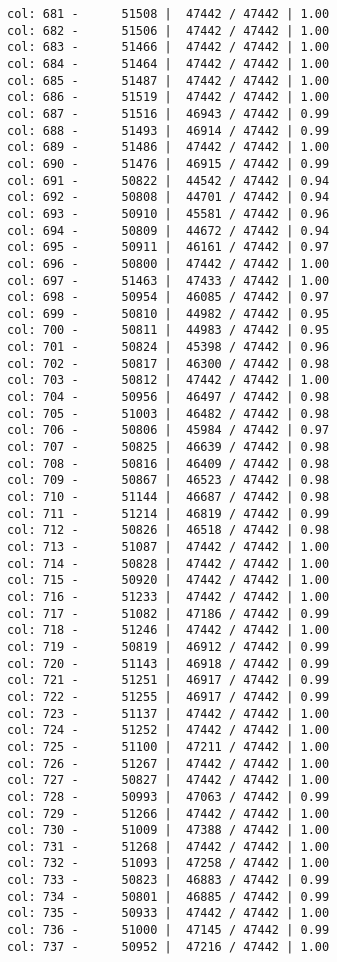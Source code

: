 \documentclass[11pt]{article}
\begin{document}
\begin{Verbatim}[commandchars=\\\{\}]
col: 681 -      51508 |  47442 / 47442 | 1.00
col: 682 -      51506 |  47442 / 47442 | 1.00
col: 683 -      51466 |  47442 / 47442 | 1.00
col: 684 -      51464 |  47442 / 47442 | 1.00
col: 685 -      51487 |  47442 / 47442 | 1.00
col: 686 -      51519 |  47442 / 47442 | 1.00
col: 687 -      51516 |  46943 / 47442 | 0.99
col: 688 -      51493 |  46914 / 47442 | 0.99
col: 689 -      51486 |  47442 / 47442 | 1.00
col: 690 -      51476 |  46915 / 47442 | 0.99
col: 691 -      50822 |  44542 / 47442 | 0.94
col: 692 -      50808 |  44701 / 47442 | 0.94
col: 693 -      50910 |  45581 / 47442 | 0.96
col: 694 -      50809 |  44672 / 47442 | 0.94
col: 695 -      50911 |  46161 / 47442 | 0.97
col: 696 -      50800 |  47442 / 47442 | 1.00
col: 697 -      51463 |  47433 / 47442 | 1.00
col: 698 -      50954 |  46085 / 47442 | 0.97
col: 699 -      50810 |  44982 / 47442 | 0.95
col: 700 -      50811 |  44983 / 47442 | 0.95
col: 701 -      50824 |  45398 / 47442 | 0.96
col: 702 -      50817 |  46300 / 47442 | 0.98
col: 703 -      50812 |  47442 / 47442 | 1.00
col: 704 -      50956 |  46497 / 47442 | 0.98
col: 705 -      51003 |  46482 / 47442 | 0.98
col: 706 -      50806 |  45984 / 47442 | 0.97
col: 707 -      50825 |  46639 / 47442 | 0.98
col: 708 -      50816 |  46409 / 47442 | 0.98
col: 709 -      50867 |  46523 / 47442 | 0.98
col: 710 -      51144 |  46687 / 47442 | 0.98
col: 711 -      51214 |  46819 / 47442 | 0.99
col: 712 -      50826 |  46518 / 47442 | 0.98
col: 713 -      51087 |  47442 / 47442 | 1.00
col: 714 -      50828 |  47442 / 47442 | 1.00
col: 715 -      50920 |  47442 / 47442 | 1.00
col: 716 -      51233 |  47442 / 47442 | 1.00
col: 717 -      51082 |  47186 / 47442 | 0.99
col: 718 -      51246 |  47442 / 47442 | 1.00
col: 719 -      50819 |  46912 / 47442 | 0.99
col: 720 -      51143 |  46918 / 47442 | 0.99
col: 721 -      51251 |  46917 / 47442 | 0.99
col: 722 -      51255 |  46917 / 47442 | 0.99
col: 723 -      51137 |  47442 / 47442 | 1.00
col: 724 -      51252 |  47442 / 47442 | 1.00
col: 725 -      51100 |  47211 / 47442 | 1.00
col: 726 -      51267 |  47442 / 47442 | 1.00
col: 727 -      50827 |  47442 / 47442 | 1.00
col: 728 -      50993 |  47063 / 47442 | 0.99
col: 729 -      51266 |  47442 / 47442 | 1.00
col: 730 -      51009 |  47388 / 47442 | 1.00
col: 731 -      51268 |  47442 / 47442 | 1.00
col: 732 -      51093 |  47258 / 47442 | 1.00
col: 733 -      50823 |  46883 / 47442 | 0.99
col: 734 -      50801 |  46885 / 47442 | 0.99
col: 735 -      50933 |  47442 / 47442 | 1.00
col: 736 -      51000 |  47145 / 47442 | 0.99
col: 737 -      50952 |  47216 / 47442 | 1.00

\end{Verbatim}
\end{document}
